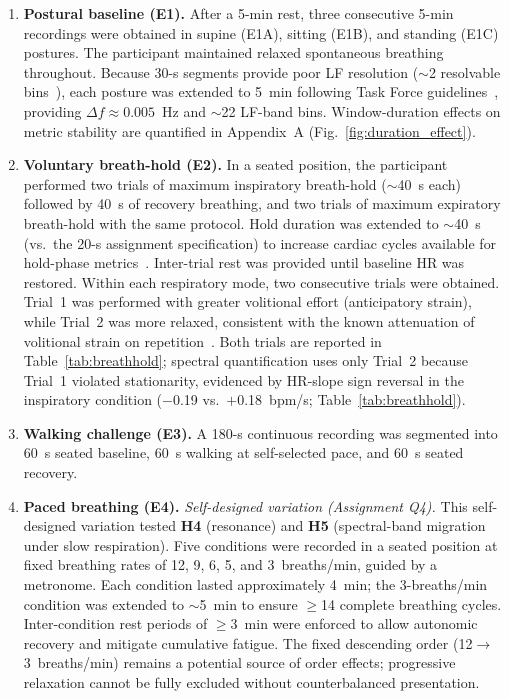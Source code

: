 \documentclass[conference]{IEEEtran}
\begin{document}
\begin{enumerate}
\item \textbf{Postural baseline (E1).}
  After a 5-min rest, three consecutive 5-min recordings were obtained
  in supine (E1A), sitting (E1B), and standing (E1C) postures.
  The participant maintained relaxed spontaneous breathing throughout.
  Because 30-s segments provide poor LF resolution
  ($\sim$2 resolvable bins~\cite{oppenheim1999}), each posture was
  extended to 5~min following Task Force
  guidelines~\cite{taskforce1996}, providing $\Delta f \approx
  0.005$~Hz and $\sim$22 LF-band bins.
  Window-duration effects on metric stability are quantified in
  Appendix~A (Fig.~\ref{fig:duration_effect}).

\item \textbf{Voluntary breath-hold (E2).}
  In a seated position, the participant performed two trials of
  maximum inspiratory breath-hold ($\sim$40~s each) followed by 40~s
  of recovery breathing, and two trials of maximum expiratory
  breath-hold with the same protocol.
  Hold duration was extended to $\sim$40~s (vs.\ the 20-s assignment
  specification) to increase cardiac cycles available for hold-phase
  metrics~\cite{taskforce1996}.
  Inter-trial rest was provided until baseline HR was restored.
  Within each respiratory mode, two consecutive trials were obtained.
  Trial~1 was performed with greater volitional effort (anticipatory
  strain), while Trial~2 was more relaxed, consistent with the known
  attenuation of volitional strain on repetition~\cite{berntson1997}.
  Both trials are reported in Table~\ref{tab:breathhold}; spectral
  quantification uses only Trial~2 because Trial~1 violated
  stationarity, evidenced by HR-slope sign reversal in the inspiratory
  condition ($-$0.19 vs.\ $+$0.18~bpm/s;
  Table~\ref{tab:breathhold}).

\item \textbf{Walking challenge (E3).}
  A 180-s continuous recording was segmented into 60~s seated
  baseline, 60~s walking at self-selected pace, and 60~s seated
  recovery.

\item \textbf{Paced breathing (E4).}
  \emph{Self-designed variation (Assignment Q4).}
  This self-designed variation tested \textbf{H4} (resonance) and
  \textbf{H5} (spectral-band migration under slow respiration).
  Five conditions were recorded in a seated position at fixed
  breathing rates of 12, 9, 6, 5, and 3~breaths/min, guided by a
  metronome.
  Each condition lasted approximately 4~min; the 3-breaths/min
  condition was extended to $\sim$5~min to ensure $\geq$14 complete
  breathing cycles.
  Inter-condition rest periods of $\geq$3~min were enforced to
  allow autonomic recovery and mitigate cumulative fatigue.
  The fixed descending order (12$\to$3~breaths/min) remains a
  potential source of order effects; progressive relaxation cannot
  be fully excluded without counterbalanced presentation.

\end{enumerate}
\end{document}
